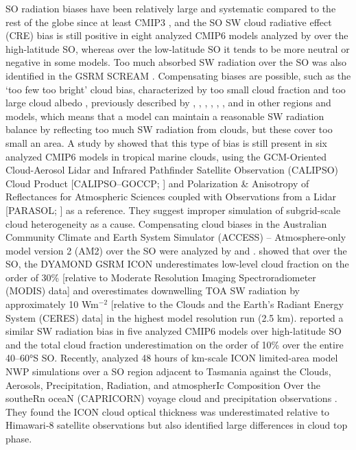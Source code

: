 \documentclass[draft]{agujournal2019}
\begin{document}
SO radiation biases have been relatively large and systematic compared to the rest of the globe since at least CMIP3 , and the SO SW cloud radiative effect (CRE) bias is still positive in eight analyzed CMIP6 models analyzed by  over the high-latitude SO, whereas over the low-latitude SO it tends to be more neutral or negative in some models. Too much absorbed SW radiation over the SO was also identified in the GSRM SCREAM . Compensating biases are possible, such as the `too few too bright' cloud bias, characterized by too small cloud fraction and too large cloud albedo , previously described by , , , , , , and  in other regions and models, which means that a model can maintain a reasonable SW radiation balance by reflecting too much SW radiation from clouds, but these cover too small an area. A study by  showed that this type of bias is still present in six analyzed CMIP6 models in tropical marine clouds, using the GCM-Oriented Cloud-Aerosol Lidar and Infrared Pathfinder Satellite Observation (CALIPSO) Cloud Product [CALIPSO--GOCCP; ] and Polarization \& Anisotropy of Reflectances for Atmospheric Sciences coupled with Observations from a Lidar [PARASOL; ] as a reference. They suggest improper simulation of subgrid-scale cloud heterogeneity as a cause. Compensating cloud biases in the Australian Community Climate and Earth System Simulator (ACCESS) – Atmosphere-only model version 2 (AM2) over the SO were analyzed by  and .  showed that over the SO, the DYAMOND GSRM ICON underestimates low-level cloud fraction on the order of 30\% [relative to Moderate Resolution Imaging Spectroradiometer (MODIS) data] and overestimates downwelling TOA SW radiation by approximately 10 Wm$^\mathrm{-2}$ [relative to the Clouds and the Earth’s Radiant Energy System (CERES) data] in the highest model resolution run (2.5 km).  reported a similar SW radiation bias in five analyzed CMIP6 models over high-latitude SO and the total cloud fraction underestimation on the order of 10\% over the entire 40--60°S SO. Recently,  analyzed 48 hours of km-scale ICON limited-area model NWP simulations over a SO region adjacent to Tasmania against the Clouds, Aerosols, Precipitation, Radiation, and atmospherIc Composition Over the southeRn oceaN (CAPRICORN) voyage cloud and precipitation observations . They found the ICON cloud optical thickness was underestimated relative to Himawari‐8 satellite observations but also identified large differences in cloud top phase.
\end{document}
